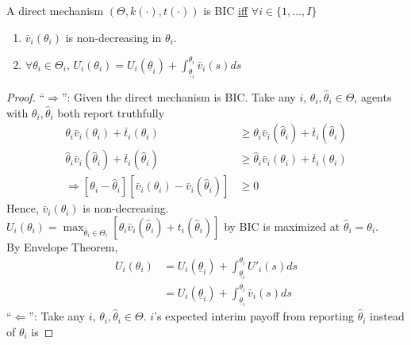 \documentclass[11pt]{elegantbook_2}
\begin{document}
\begin{proposition}\label{Linear utility model_BIC}
    A direct mechanism $\left(\Theta,k(\cdot),t(\cdot)\right)$ is BIC \underline{iff} $\forall i\in\{1,...,I\}$
    \begin{enumerate}[(1).]
        \item $\bar{v}_i(\theta_i)$ is non-decreasing in $\theta_i$.
        \item $\forall \theta_i\in\Theta_i$, $U_i(\theta_i)=U_i(\underline{\theta}_i)+\int_{\underline{\theta}_i}^{\theta_i}\bar{v}_i(s)ds$
    \end{enumerate}
\end{proposition}
\begin{proof}
    ``$\Rightarrow$'': Given the direct mechanism is BIC. Take any $i$, $\theta_i,\hat{\theta}_i\in\Theta$, agents with $\theta_i,\hat{\theta}_i$ both report truthfully
    \begin{equation}
        \begin{aligned}
            \theta_i \bar{v}_i(\theta_i)+\bar{t}_i(\theta_i)&\geq \theta_i \bar{v}_i(\hat{\theta}_i)+\bar{t}_i(\hat{\theta}_i)\\
            \hat{\theta}_i \bar{v}_i(\hat{\theta}_i)+\bar{t}_i(\hat{\theta}_i)&\geq \hat{\theta}_i \bar{v}_i(\theta_i)+\bar{t}_i(\theta_i)\\
            \Rightarrow [\theta_i-\hat{\theta}_i][\bar{v}_i(\theta_i)-\bar{v}_i(\hat{\theta}_i)]&\geq 0
        \end{aligned}
        \nonumber
    \end{equation}
    Hence, $\bar{v}_i(\theta_i)$ is non-decreasing.\\
    $U_i(\theta_i)=\max_{\hat{\theta}_i\in\Theta_i}\left[\theta_i\bar{v}_i(\hat{\theta}_i)+t_i(\hat{\theta}_i)\right]$ by BIC is maximized at $\hat{\theta}_i=\theta_i$.\\
    By Envelope Theorem,
    \begin{equation}
        \begin{aligned}
            U_i(\theta_i)&=U_i(\underline{\theta}_i)+\int_{\underline{\theta}_i}^{\theta_i}U'_i(s)ds\\
            &=U_i(\underline{\theta}_i)+\int_{\underline{\theta}_i}^{\theta_i}\bar{v}_i(s)ds
        \end{aligned}
        \nonumber
    \end{equation}
    ``$\Leftarrow$'': Take any $i$, $\theta_i,\hat{\theta}_i\in\Theta$. $i$'s expected interim payoff from reporting $\hat{\theta}_i$ instead of $\theta_i$ is

\end{proof}
\end{document}
